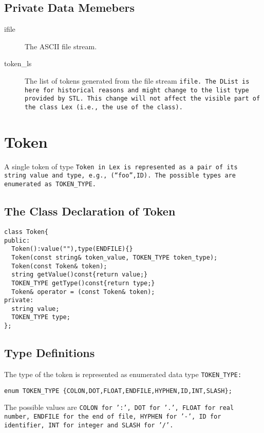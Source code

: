 \subsection{Private Data Memebers}
\begin{description}
  \item [ifile] The ASCII file stream.
  \item [token\_ls] The list of tokens generated 
   from the file stream \tt ifile\rm. The \tt DList \rm
   is here for historical reasons and might change to the \tt list
  \rm type provided by STL. This change will not affect the visible part
   of the class \tt Lex \rm (i.e., the use of the class). 
\end{description}

\section{Token}
A single token of type \tt Token  \rm in \tt Lex \rm is represented as
a pair of its string value and type, e.g., (``foo'',ID).  The possible
types are enumerated as \tt TOKEN\_TYPE\rm.

\subsection{The Class Declaration of Token}
\begin{verbatim}
class Token{
public:
  Token():value(""),type(ENDFILE){}
  Token(const string& token_value, TOKEN_TYPE token_type);
  Token(const Token& token);
  string getValue()const{return value;}
  TOKEN_TYPE getType()const{return type;}
  Token& operator = (const Token& token);
private:
  string value;
  TOKEN_TYPE type;
};
\end{verbatim}

\subsection{Type Definitions}
The type of the token is represented as enumerated data type 
\tt TOKEN\_TYPE\rm:

\begin{center}
\tt enum TOKEN\_TYPE \{COLON,DOT,FLOAT,ENDFILE,HYPHEN,ID,INT,SLASH\}; 
\rm
\end{center}

The possible values are \tt COLON \rm for ':', \tt DOT \rm for '.', 
\tt FLOAT \rm for real number, \tt ENDFILE \rm for the end of file, 
\tt HYPHEN \rm for '-', \tt ID \rm for identifier, \tt INT \rm for
integer and \tt SLASH \rm for '/'.

